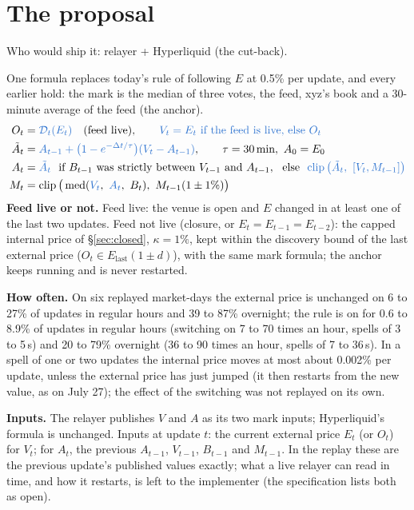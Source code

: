 \documentclass[10.5pt,a4paper]{article}
\newcommand{\chg}[1]{\ensuremath{{\color[HTML]{2F74D0}#1}}}
\newcommand{\med}{\operatorname{med}}
\newcommand{\clip}{\operatorname{clip}}
\newcommand{\D}{\mathcal{D}}
\begin{document}
\section{The proposal}\label{sec:three}
\par{\small\color{mute}Who would ship it: relayer + Hyperliquid (the cut-back).}\par
One formula replaces today's rule of following $E$ at 0.5\% per update, and every earlier hold: the mark is the median of three votes, the feed, xyz's book and a 30-minute average of the feed (the anchor).
\begin{align}
O_t &= \chg{\D_t(E_t)}\quad\text{(feed live)},\qquad \chg{V_t = E_t \text{ if the feed is live, else } O_t}\\
\tilde A_t &= \chg{A_{t-1} + \big(1 - e^{-\Delta t/\tau}\big)(V_t - A_{t-1})},\qquad \tau = 30\,\text{min},\ A_0 = E_0\\
A_t &= \chg{\tilde A_t}\ \text{ if } B_{t-1} \text{ was strictly between } V_{t-1} \text{ and } A_{t-1},\ \text{ else }\ \chg{\clip\big(\tilde A_t,\ [V_t, M_{t-1}]\big)}\\
M_t &= \clip\big(\med(\chg{V_t},\ \chg{A_t},\ B_t),\ M_{t-1}(1\pm 1\%)\big)
\end{align}
\textbf{Feed live or not.} Feed live: the venue is open and $E$ changed in at least one of the last two updates. Feed not live (closure, or $E_t = E_{t-1} = E_{t-2}$): the capped internal price of \S\ref{sec:closed}, $\kappa = 1\%$, kept within the discovery bound of the last external price ($O_t \in E_{\text{last}}(1\pm d)$), with the same mark formula; the anchor keeps running and is never restarted.

\textbf{How often.} On six replayed market-days the external price is unchanged on 6 to 27\% of updates in regular hours and 39 to 87\% overnight; the rule is on for 0.6 to 8.9\% of updates in regular hours (switching on 7 to 70 times an hour, spells of 3 to 5\,s) and 20 to 79\% overnight (36 to 90 times an hour, spells of 7 to 36\,s). In a spell of one or two updates the internal price moves at most about 0.002\% per update, unless the external price has just jumped (it then restarts from the new value, as on July 27); the effect of the switching was not replayed on its own.

\textbf{Inputs.} The relayer publishes $V$ and $A$ as its two mark inputs; Hyperliquid's formula is unchanged. Inputs at update $t$: the current external price $E_t$ (or $O_t$) for $V_t$; for $A_t$, the previous $A_{t-1}$, $V_{t-1}$, $B_{t-1}$ and $M_{t-1}$. In the replay these are the previous update's published values exactly; what a live relayer can read in time, and how it restarts, is left to the implementer (the specification lists both as open). 
\end{document}
